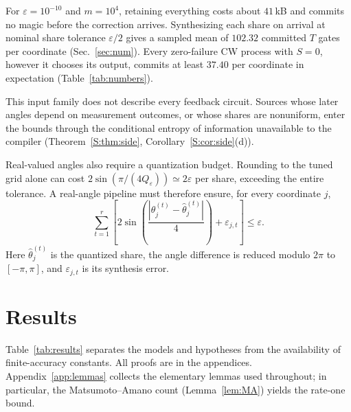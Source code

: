 \documentclass[aps,prx,twocolumn,superscriptaddress,nofootinbib,longbibliography]{revtex4-2}
\theoremstyle{plain}
\theoremstyle{definition}
\theoremstyle{remark}
\begin{document}
For $\varepsilon=10^{-10}$ and $m=10^4$, retaining everything costs about $41$\,kB and commits no magic before the correction arrives. Synthesizing each share on arrival at nominal share tolerance $\varepsilon/2$ gives a sampled mean of $102.32$ committed $T$ gates per coordinate (Sec.~\ref{sec:num}). Every zero-failure CW process with $S=0$, however it chooses its output, commits at least $37.40$ per coordinate in expectation (Table~\ref{tab:numbers}).

This input family does not describe every feedback circuit. Sources whose later angles depend on measurement outcomes, or whose shares are nonuniform, enter the bounds through the conditional entropy of information unavailable to the compiler (Theorem~\ref{S:thm:side}, Corollary~\ref{S:cor:side}(d)).

Real-valued angles also require a quantization budget. Rounding to the tuned grid alone can cost $2\sin(\pi/(4Q_\varepsilon))\simeq2\varepsilon$ per share, exceeding the entire tolerance. A real-angle pipeline must therefore ensure, for every coordinate $j$,
\begin{equation}\label{eq:anglebudget}
\sum_{t=1}^r\left[2\sin\!\left(\frac{|\theta^{(t)}_j-\hat\theta^{(t)}_j|}{4}\right)+\varepsilon_{j,t}\right]\le\varepsilon.
\end{equation}
Here $\hat\theta^{(t)}_j$ is the quantized share, the angle difference is reduced modulo $2\pi$ to $[-\pi,\pi]$, and $\varepsilon_{j,t}$ is its synthesis error.


\section{Results}\label{sec:results}

Table~\ref{tab:results} separates the models and hypotheses from the availability of finite-accuracy constants. All proofs are in the appendices. Appendix~\ref{app:lemmas} collects the elementary lemmas used throughout; in particular, the Matsumoto--Amano count (Lemma~\ref{lem:MA}) yields the rate-one bound.
\end{document}
